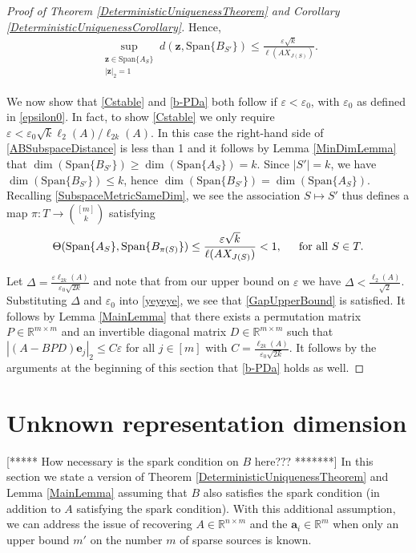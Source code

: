 \documentclass[journal, onecolumn]{IEEEtran}
\begin{document}
\begin{proof}[Proof of Theorem \ref{DeterministicUniquenessTheorem} and Corollary \ref{DeterministicUniquenessCorollary}]
Hence,
\begin{align}\label{ABSubspaceDistance}
\sup_{ \substack{ \mathbf{z} \in \text{Span}\{A_{S}\} \\ |\mathbf{z}|_2 = 1} } d(\mathbf{z}, \text{Span}\{B_{S'}\}) \leq \frac{\varepsilon\sqrt{k}}{\ell(AX_{J(S)})}.
\end{align}

We now show that \eqref{Cstable} and \eqref{b-PDa} both follow if $\varepsilon < \varepsilon_0$, with $\varepsilon_0$ as defined in \eqref{epsilon0}. In fact, to show \eqref{Cstable} we only require $\varepsilon <  \varepsilon_0 \sqrt{k} \ell_2(A)/\ell_{2k}(A)$. In this case the right-hand side of \eqref {ABSubspaceDistance} is less than 1 and it follows by Lemma \ref{MinDimLemma} that $\dim(\text{Span}\{B_{S'}\}) \geq \dim(\text{Span}\{A_{S}\}) = k$. Since $|S'| = k$, we have $\dim(\text{Span}\{B_{S'}\}) \leq k$, hence $\dim(\text{Span}\{B_{S'}\}) = \dim(\text{Span}\{A_{S}\})$. Recalling \eqref{SubspaceMetricSameDim},  we see the association $S \mapsto S'$ thus defines a map $\pi: T \to {[m] \choose k}$ satisfying
\begin{align}\label{yeyeye}
\Theta(\text{Span}\{A_{S}\}, \text{Span}\{B_{\pi(S)}\}) \leq \frac{\varepsilon\sqrt{k}}{\ell(AX_{J(S)})} < 1, \indent \text{for all } S \in T.
\end{align}

Let $\Delta =  \frac{\varepsilon \ell_{2k}(A)}{\varepsilon_0 \sqrt{2k}}$ and note that from our upper bound on $\varepsilon$ we have $\Delta < \frac{\ell_2(A)}{\sqrt{2}}$. Substituting $\Delta$ and $\varepsilon_0$ into \eqref{yeyeye}, we see that \eqref{GapUpperBound} is satisfied. It follows by Lemma \ref{MainLemma} that there exists a permutation matrix $P \in \mathbb{R}^{m \times m}$ and an invertible diagonal matrix $D \in \mathbb{R}^{m \times m}$ such that $|(A - BPD)\mathbf{e}_j|_2 \leq C\varepsilon$ for all $j \in [m]$ with $C = \frac{\ell_{2k}(A)}{\varepsilon_0\sqrt{2k}}$. It follows by the arguments at the beginning of this section that \eqref{b-PDa} holds as well.
\end{proof}


\section{Unknown representation dimension}\label{mleqm}

[***** How necessary is the spark condition on $B$ here??? *******]
In this section we state a version of Theorem \ref{DeterministicUniquenessTheorem} and Lemma \ref{MainLemma} assuming that $B$ also satisfies the spark condition (in addition to $A$ satisfying the spark condition). With this additional assumption, we can address the issue of recovering $A \in \mathbb{R}^{n \times m}$ and the $\mathbf{a}_i \in \mathbb{R}^m$ when only an upper bound $m'$ on the number $m$ of sparse sources is known.
\end{document}
